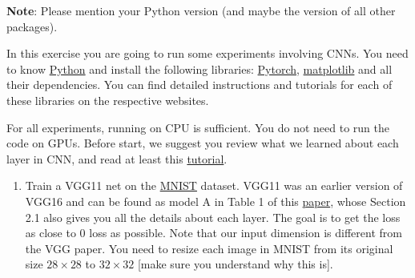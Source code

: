 \documentclass[10pt,letter,notitlepage]{article}
\newcommand{\blue}[1]{{\color{blue}#1}}
\newcommand{\magenta}[1]{{\color{magenta}#1}}
\newcounter{exercise}
\begin{document}
\begin{exercise}
	\blue{\textbf{Note}: Please mention your Python version (and maybe the version of all other packages).}
	
	
	In this exercise you are going to run some experiments involving CNNs. You need to know \href{https://www.python.org/}{\magenta{Python}} and install the following libraries: \href{https://pytorch.org/get-started/locally/}{\magenta{Pytorch}}, \href{https://matplotlib.org/}{\magenta{matplotlib}} and all their dependencies. You can find detailed instructions and tutorials for each of these libraries on the respective websites. 
	
	For all experiments, running on CPU is sufficient. You do not need to run the code on GPUs.
	Before start, we suggest you review what we learned about each layer in CNN, and read at least this \href{https://pytorch.org/tutorials/beginner/blitz/neural_networks_tutorial.html}{\magenta{tutorial}}.
	
	\begin{enumerate}
		\item Train a VGG11 net on the \href{https://pytorch.org/vision/0.9/datasets.html#mnist}{\magenta{MNIST}} dataset. 
		VGG11 was an earlier version of VGG16 and can be found as model A in Table 1 of this \href{https://arxiv.org/pdf/1409.1556.pdf}{\magenta{paper}}, whose Section 2.1 also gives you all the details about each layer.
		The goal is to get the loss as close to 0 loss as possible. Note that our input dimension is different from the VGG paper. You need to resize each image in MNIST from its original size $28 \times 28$ to $32 \times 32$ [make sure you understand why this is].
		

\end{enumerate}
\end{exercise}
\end{document}
